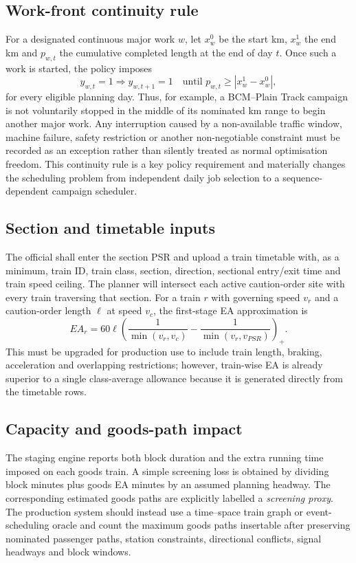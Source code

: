 \documentclass[10pt,a4paper]{article}
\begin{document}
\subsection{Work-front continuity rule}
For a designated continuous major work $w$, let $x_w^0$ be the start km, $x_w^1$ the end km and $p_{w,t}$ the cumulative completed length at the end of day $t$. Once such a work is started, the policy imposes
\begin{equation}
 y_{w,t}=1 \Rightarrow y_{w,t+1}=1 \quad \text{until }p_{w,t}\ge |x_w^1-x_w^0|,
\end{equation}
for every eligible planning day. Thus, for example, a BCM--Plain Track campaign is not voluntarily stopped in the middle of its nominated km range to begin another major work. Any interruption caused by a non-available traffic window, machine failure, safety restriction or another non-negotiable constraint must be recorded as an exception rather than silently treated as normal optimisation freedom. This continuity rule is a key policy requirement and materially changes the scheduling problem from independent daily job selection to a sequence-dependent campaign scheduler.

\subsection{Section and timetable inputs}
The official shall enter the section PSR and upload a train timetable with, as a minimum, train ID, train class, section, direction, sectional entry/exit time and train speed ceiling. The planner will intersect each active caution-order site with every train traversing that section. For a train $r$ with governing speed $v_r$ and a caution-order length $\ell$ at speed $v_c$, the first-stage EA approximation is
\begin{equation}
 EA_r=60\ell\left(\frac{1}{\min(v_r,v_c)}-\frac{1}{\min(v_r,v_{PSR})}\right)_+.
\end{equation}
This must be upgraded for production use to include train length, braking, acceleration and overlapping restrictions; however, train-wise EA is already superior to a single class-average allowance because it is generated directly from the timetable rows.

\subsection{Capacity and goods-path impact}
The staging engine reports both block duration and the extra running time imposed on each goods train. A simple screening loss is obtained by dividing block minutes plus goods EA minutes by an assumed planning headway. The corresponding estimated goods paths are explicitly labelled a \emph{screening proxy}. The production system should instead use a time--space train graph or event-scheduling oracle and count the maximum goods paths insertable after preserving nominated passenger paths, station constraints, directional conflicts, signal headways and block windows.
\end{document}
